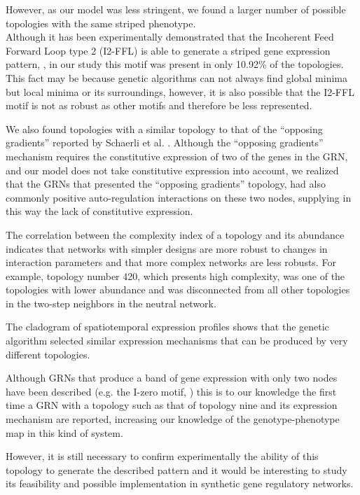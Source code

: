 \documentclass[10pt,letterpaper]{article}
\begin{document}
However, as our model was less stringent, we found a larger number of possible 
topologies with the same striped phenotype.\\

Although it has been experimentally demonstrated that the Incoherent Feed 
Forward Loop type 2 (I2-FFL) is able to generate a striped gene expression 
pattern, \cite{Schaerli2014, Basu2005}, in our study this motif was present in 
only 10.92\% of the topologies. This fact may be because genetic algorithms 
can not always find global minima but local minima or its surroundings, however,
it is also possible that the I2-FFL motif is not as robust as other motifs and 
therefore be less represented.

We also found topologies with a similar topology to that of the “opposing
gradients” reported by Schaerli et al. \cite{Schaerli2018,Schaerli2014}.
Although the “opposing gradients” mechanism requires the constitutive expression
of two of the genes in the GRN, and our model does not take constitutive
expression into account, we realized that the GRNs that presented the “opposing
gradients” topology, had also commonly positive auto-regulation interactions on
these two nodes, supplying in this way the lack of constitutive expression.

The correlation between the complexity index of a topology and its abundance 
indicates that networks with simpler designs are more robust to changes in 
interaction parameters and that more complex networks are less robusts. For 
example, topology number 420, which presents high complexity, was one of the 
topologies with lower abundance and was disconnected from all other topologies 
in the two-step neighbors in the neutral network.

The cladogram of spatiotemporal expression profiles shows that the genetic 
algorithm selected similar expression mechanisms that can be produced by very 
different topologies.

Although GRNs that produce a band of gene expression with only two nodes have 
been described (e.g. the I-zero motif, \cite{Schaerli2014}) this is to our 
knowledge the first time a GRN with a topology such as that of topology nine 
and its expression mechanism are reported, increasing our knowledge of the 
genotype-phenotype map in this kind of system. 

However, it is still necessary to confirm experimentally the ability of this 
topology to generate the described pattern and it would be interesting to 
study its feasibility and possible implementation in synthetic gene regulatory 
networks.
\end{document}
